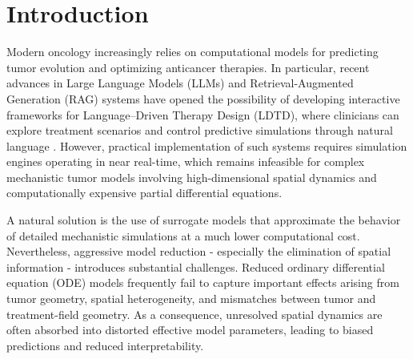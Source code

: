 
\section{Introduction}

Modern oncology increasingly relies on computational models for
predicting tumor evolution and optimizing anticancer therapies. In
particular, recent advances in Large Language Models (LLMs) and
Retrieval-Augmented Generation (RAG) systems have opened the possibility
of developing interactive frameworks for Language--Driven Therapy Design
(LDTD), where clinicians can explore treatment scenarios and control
predictive simulations through natural language \cite{reka2026conversational}. However, practical
implementation of such systems requires simulation engines operating in
near real-time, which remains infeasible for complex mechanistic tumor
models involving high-dimensional spatial dynamics and computationally
expensive partial differential equations.

A natural solution is the use of surrogate models that approximate the
behavior of detailed mechanistic simulations at a much lower
computational cost. Nevertheless, aggressive model reduction -
especially the elimination of spatial information - introduces
substantial challenges. Reduced ordinary differential equation (ODE)
models frequently fail to capture important effects arising from tumor
geometry, spatial heterogeneity, and mismatches between tumor and
treatment-field geometry. As a consequence, unresolved spatial dynamics
are often absorbed into distorted effective model parameters, leading to
biased predictions and reduced interpretability.

